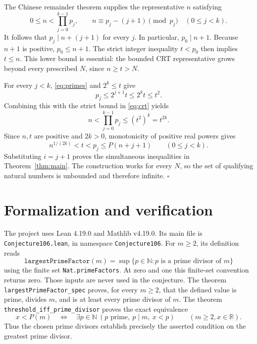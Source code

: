 \documentclass[11pt]{article}
\newcommand{\N}{\mathbb N}
\newcommand{\R}{\mathbb R}
\begin{document}
The Chinese remainder theorem supplies the representative $n$ satisfying
\begin{equation}\label{eq:crt}
  0\le n<\prod_{j=0}^{k-1}p_j,
  \qquad n\equiv p_j-(j+1)\pmod{p_j}
  \quad(0\le j<k).
\end{equation}
It follows that $p_j\mid n+(j+1)$ for every $j$.
In particular, $p_0\mid n+1$. Because $n+1$ is positive,
$p_0\le n+1$. The strict integer inequality $t<p_0$ then implies
$t\le n$. This lower bound is essential: the bounded CRT representative
grows beyond every prescribed $N$, since $n\ge t>N$.

For every $j<k$, \eqref{eq:primes} and $2^k\le t$ give
\[
  p_j\le2^{j+1}t\le2^kt\le t^2.
\]
Combining this with the strict bound in \eqref{eq:crt} yields
\[
  n<\prod_{j=0}^{k-1}p_j\le(t^2)^k=t^{2k}.
\]
Since $n,t$ are positive and $2k>0$, monotonicity of positive real powers gives
\[
  n^{1/(2k)}<t<p_j\le P(n+j+1)
  \qquad(0\le j<k).
\]
Substituting $i=j+1$ proves the simultaneous inequalities in
Theorem~\ref{thm:main}. The construction works for every $N$, so the set of
qualifying natural numbers is unbounded and therefore infinite.
\hfill$\square$

\section{Formalization and verification}
The project uses Lean 4.19.0 and Mathlib v4.19.0. Its main file is
\texttt{Conjecture106.lean}, in namespace \texttt{Conjecture106}.
For $m\ge2$, its definition reads
\[
  \texttt{largestPrimeFactor}(m)
    =\sup\{p\in\N:p\text{ is a prime divisor of }m\}
\]
using the finite set \texttt{Nat.primeFactors}. At zero and one this
finite-set convention returns zero. Those inputs are never used in the
conjecture. The theorem \texttt{largestPrimeFactor\_spec} proves, for every
$m\ge2$, that the defined value is prime, divides $m$, and is at least every
prime divisor of $m$. The theorem \texttt{threshold\_iff\_prime\_divisor}
proves the exact equivalence
\[
  x<P(m)\quad\Longleftrightarrow\quad
  \exists p\in\N\ (p\text{ prime},\ p\mid m,\ x<p)
  \qquad(m\ge2, x\in\R).
\]
Thus the chosen prime divisors establish precisely the asserted condition
on the greatest prime divisor.
\end{document}
